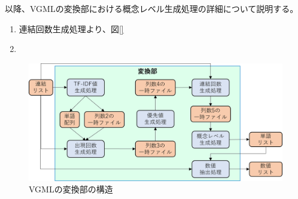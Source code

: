 以降、VGMLの変換部における概念レベル生成処理の詳細について説明する。

\begin{enumerate}
    \item 連結回数生成処理より、図\ref{}
    \item 
\end{enumerate}


\begin{figure}[t]
    \begin{center}
        \includegraphics[width=1.0\columnwidth]{image/vgml_transfer.png}
        \caption{VGMLの変換部の構造}
        \label{fig:vgml_transfer}
    \end{center}
\end{figure}
